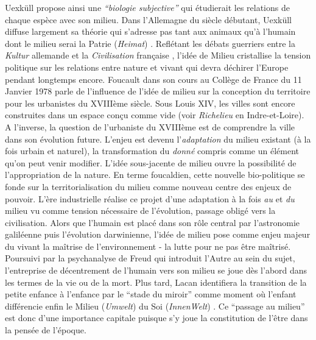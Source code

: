 Uexküll propose ainsi une \textit{``biologie subjective''} qui étudierait les relations de chaque espèce avec son milieu. Dans l’Allemagne du siècle débutant, Uexküll diffuse largement sa théorie qui s’adresse pas tant aux animaux qu’à l’humain dont le milieu serai la Patrie (\textit{Heimat}) \citep{Feuerhahn2009}. Reflétant les débats guerriers entre la \textit{Kultur} allemande et la \textit{Civilisation} française \citep{Elias1975}, l’idée de Milieu cristallise la tension politique sur les relations entre nature et vivant qui devra déchirer l’Europe pendant longtemps encore. Foucault dans son cours au Collège de France du 11 Janvier 1978 parle de l’influence de l’idée de milieu sur la conception du territoire pour les urbanistes du XVIIIème siècle. Sous Louis XIV, les villes sont encore construites dans un espace conçu comme vide (voir \textit{Richelieu} en Indre-et-Loire). A l'inverse, la question de l’urbaniste du XVIIIème est de comprendre la ville dans son évolution future. L’enjeu est devenu l’\textit{adaptation} du milieu existant (à la fois urbain et naturel), la transformation du \textit{donné} compris comme un élément qu’on peut venir modifier. L’idée sous-jacente de milieu ouvre la possibilité de l’appropriation de la nature. En terme foucaldien, cette nouvelle bio-politique se fonde sur la territorialisation du milieu comme nouveau centre des enjeux de pouvoir. L’ère industrielle réalise ce projet d’une adaptation à la fois \textit{au} et \textit{du} milieu vu comme tension nécessaire de l’évolution, passage obligé vers la civilisation. Alors que l’humain est placé dans son rôle central par l’astronomie galiléenne puis l’évolution darwinienne, l’idée de milieu pose comme enjeu majeur du vivant la maîtrise de l’environnement - la lutte pour ne pas être maîtrisé. Poursuivi par la psychanalyse de Freud qui introduit l’Autre au sein du sujet, l’entreprise de décentrement de l’humain vers son milieu se joue dès l’abord dans les termes de la vie ou de la mort. Plus tard, Lacan identifiera la transition de la petite enfance à l’enfance par le ``stade du miroir'' comme moment où l’enfant différencie enfin le Milieu (\textit{Umwelt}) du Soi (\textit{InnenWelt}) \citep{Lacan2001}. Ce ``passage au milieu'' est donc d’une importance capitale puisque s’y joue la constitution de l’être dans la pensée de l'époque.

